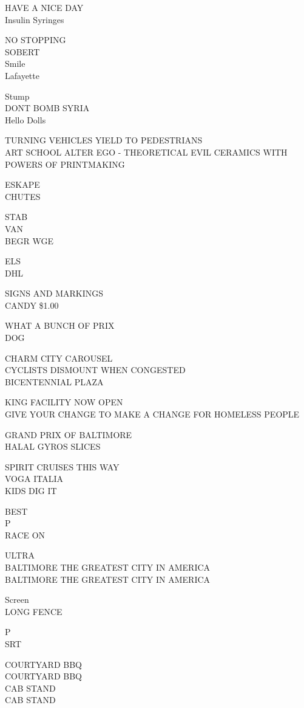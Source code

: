 \documentclass[10pt,letterpaper]{article}
\begin{document}
HAVE A NICE DAY\\
Insulin Syringes

NO STOPPING\\
SOBERT\\
Smile\\
Lafayette

Stump\\
DONT BOMB SYRIA\\
Hello Dolls

TURNING VEHICLES YIELD TO PEDESTRIANS\\
ART SCHOOL ALTER EGO {-} THEORETICAL EVIL CERAMICS WITH POWERS OF PRINTMAKING

ESKAPE\\
CHUTES

STAB\\
VAN\\
BEGR WGE

ELS\\
DHL

SIGNS AND MARKINGS\\
CANDY \$1.00

WHAT A BUNCH OF PRIX\\
DOG

CHARM CITY CAROUSEL\\
CYCLISTS DISMOUNT WHEN CONGESTED\\
BICENTENNIAL PLAZA

KING FACILITY NOW OPEN\\
GIVE YOUR CHANGE TO MAKE A CHANGE FOR HOMELESS PEOPLE

GRAND PRIX OF BALTIMORE\\
HALAL GYROS SLICES

SPIRIT CRUISES THIS WAY\\
VOGA ITALIA\\
KIDS DIG IT

BEST\\
P\\
RACE ON

ULTRA\\
BALTIMORE THE GREATEST CITY IN AMERICA\\
BALTIMORE THE GREATEST CITY IN AMERICA

Screen\\
LONG FENCE

P\\
SRT

COURTYARD BBQ\\
COURTYARD BBQ\\
CAB STAND\\
CAB STAND
\end{document}
